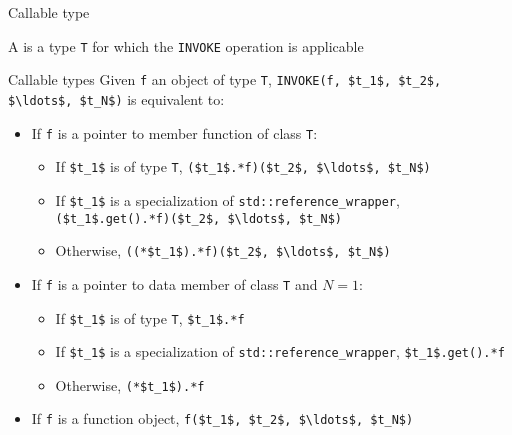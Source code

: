 \begin{frame}{Callable type}{}
  \begin{definition}
    A  is a type \lstinline!T! for which the \lstinline!INVOKE! operation is applicable
  \end{definition}

  \begin{block}{Callable types}
    Given \lstinline!f! an object of type \lstinline!T!, \lstinline[mathescape]!INVOKE(f, $t_1$, $t_2$, $\ldots$, $t_N$)! is equivalent to:
    \begin{itemize}
    \item
      If \lstinline!f! is a pointer to member function of class \lstinline!T!:
      \begin{itemize}
      \item
        If \lstinline[mathescape]!$t_1$! is of type \lstinline!T!, \lstinline[mathescape]!($t_1$.*f)($t_2$, $\ldots$, $t_N$)!
      \item
        If \lstinline[mathescape]!$t_1$! is a specialization of \lstinline!std::reference_wrapper!, \\ \hfill \lstinline[mathescape]!($t_1$.get().*f)($t_2$, $\ldots$, $t_N$)!
      \item
        Otherwise, \lstinline[mathescape]!((*$t_1$).*f)($t_2$, $\ldots$, $t_N$)!
      \end{itemize}
    \item
      If \lstinline!f! is a pointer to data member of class \lstinline!T! and $N = 1$:
      \begin{itemize}
      \item
        If \lstinline[mathescape]!$t_1$! is of type \lstinline!T!, \lstinline[mathescape]!$t_1$.*f!
      \item
        If \lstinline[mathescape]!$t_1$! is a specialization of \lstinline!std::reference_wrapper!, \lstinline[mathescape]!$t_1$.get().*f!
      \item
        Otherwise, \lstinline[mathescape]!(*$t_1$).*f!
      \end{itemize}
    \item
      If \lstinline!f! is a function object, \lstinline[mathescape]!f($t_1$, $t_2$, $\ldots$, $t_N$)!
    \end{itemize}
  \end{block}
\end{frame}

